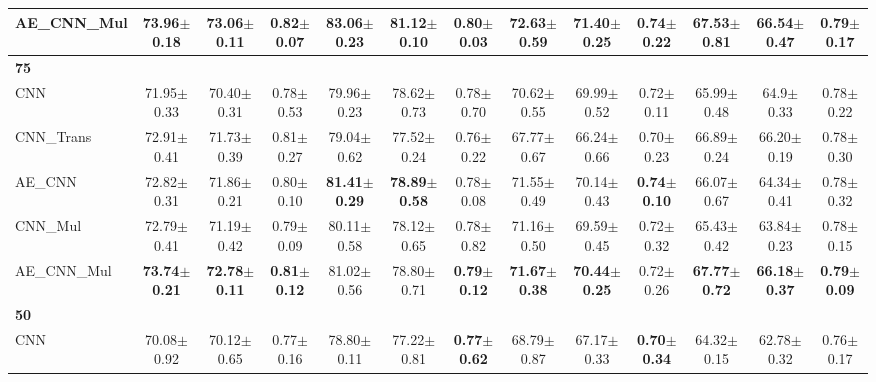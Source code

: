 \begin{table}[ht]
\begin{adjustbox}{width=\textwidth}
\begin{tabular}{lcccccccccccc}
AE\_CNN\_Mul   & 73.96$\pm$0.18          & \textbf{73.06$\pm$0.11} & \textbf{0.82$\pm$0.07} & 83.06$\pm$0.23          & 81.12$\pm$0.10          & 0.80$\pm$0.03          & \textbf{72.63$\pm$0.59} & 71.40$\pm$0.25          & \textbf{0.74$\pm$0.22} & 67.53$\pm$0.81          & 66.54$\pm$0.47          & \textbf{0.79$\pm$0.17} \\ \hline
\textbf{75}&&&&&&&&&&&& \\
CNN                   & 71.95$\pm$0.33          & 70.40$\pm$0.31          & 0.78$\pm$0.53          & 79.96$\pm$0.23          & 78.62$\pm$0.73          & 0.78$\pm$0.70          & 70.62$\pm$0.55          & 69.99$\pm$0.52          & 0.72$\pm$0.11          & 65.99$\pm$0.48          & 64.9$\pm$0.33           & 0.78$\pm$0.22          \\
CNN\_Trans         & 72.91$\pm$0.41          & 71.73$\pm$0.39          & 0.81$\pm$0.27          & 79.04$\pm$0.62          & 77.52$\pm$0.24          & 0.76$\pm$0.22          & 67.77$\pm$0.67          & 66.24$\pm$0.66          & 0.70$\pm$0.23          & 66.89$\pm$0.24          & 66.20$\pm$0.19          & 0.78$\pm$0.30          \\
AE\_CNN               & 72.82$\pm$0.31          & 71.86$\pm$0.21          & 0.80$\pm$0.10          & \textbf{81.41$\pm$0.29} & \textbf{78.89$\pm$0.58} & 0.78$\pm$0.08          & 71.55$\pm$0.49          & 70.14$\pm$0.43          & \textbf{0.74$\pm$0.10} & 66.07$\pm$0.67          & 64.34$\pm$0.41          & 0.78$\pm$0.32          \\
CNN\_Mul        & 72.79$\pm$0.41          & 71.19$\pm$0.42          & 0.79$\pm$0.09          & 80.11$\pm$0.58          & 78.12$\pm$0.65          & 0.78$\pm$0.82          & 71.16$\pm$0.50          & 69.59$\pm$0.45          & 0.72$\pm$0.32          & 65.43$\pm$0.42          & 63.84$\pm$0.23          & 0.78$\pm$0.15          \\
AE\_CNN\_Mul    & \textbf{73.74$\pm$0.21} & \textbf{72.78$\pm$0.11} & \textbf{0.81$\pm$0.12} & 81.02$\pm$0.56          & 78.80$\pm$0.71          & \textbf{0.79$\pm$0.12} & \textbf{71.67$\pm$0.38} & \textbf{70.44$\pm$0.25} & 0.72$\pm$0.26          & \textbf{67.77$\pm$0.72} & \textbf{66.18$\pm$0.37} & \textbf{0.79$\pm$0.09} \\ \hline
\textbf{50}&&&&&&&&&&&& \\
CNN                   & 70.08$\pm$0.92          & 70.12$\pm$0.65          & 0.77$\pm$0.16          & 78.80$\pm$0.11          & 77.22$\pm$0.81          & \textbf{0.77$\pm$0.62} & 68.79$\pm$0.87          & 67.17$\pm$0.33          & \textbf{0.70$\pm$0.34} & 64.32$\pm$0.15          & 62.78$\pm$0.32          & 0.76$\pm$0.17          \\

\end{tabular}
\end{adjustbox}
\end{table}
